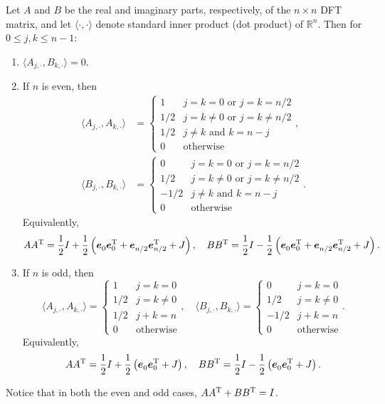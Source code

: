 \begin{lemma}
\label{lem:Inner products}
Let $A$ and $B$ be the real and imaginary parts, respectively, of the $n \times n$ DFT matrix, and let $\langle\cdot,\cdot\rangle$ denote standard inner product (dot product) of $\mathbb{R}^n$. Then for $0 \leq j,k \leq n-1$:
\begin{enumerate}[label=(\roman*)]
\item $\langle A_{j,\cdot}, B_{k,\cdot}\rangle = 0$.
\item If $n$ is even, then 
\begin{align*}
\langle A_{j,\cdot}, A_{k,\cdot}\rangle &= \begin{cases}
1 & j = k = 0 \text{ or } j = k = n/2 \\ 
1/2 & j = k \neq 0 \text{ or } j = k \neq n/2 \\ 
1/2 & j \neq k \text{ and } k = n - j \\ 
0 & \text{otherwise} \end{cases}, \\
\langle B_{j,\cdot}, B_{k,\cdot}\rangle &= \begin{cases}
0 & j = k = 0 \text{ or } j = k = n/2 \\ 
1/2 & j = k \neq 0 \text{ or } j = k \neq n/2 \\ 
-1/2 &  j \neq k \text{ and } k = n - j \\ 
0 & \text{otherwise} \end{cases}.
\end{align*}
Equivalently,
\[AA^{\mathrm{T}} = \frac{1}{2}I + \frac{1}{2}\left(\bm{e}_0^{}\bm{e}_0^{\mathrm{T}} + \bm{e}_{n/2}^{}\bm{e}_{n/2}^{\mathrm{T}} + J\right), \quad BB^{\mathrm{T}} = \frac{1}{2}I - \frac{1}{2}\left(\bm{e}_0^{}\bm{e}_0^{\mathrm{T}} + \bm{e}_{n/2}^{}\bm{e}_{n/2}^{\mathrm{T}} + J\right).\]
\item If $n$ is odd, then
\[\langle A_{j,\cdot}, A_{k,\cdot}\rangle = \begin{cases}
1 & j = k = 0 \\ 
1/2 & j = k \neq 0 \\
1/2 & j+k = n \\
0 & \text{otherwise} \end{cases}, \quad 
\langle B_{j,\cdot}, B_{k,\cdot}\rangle = \begin{cases}
0 & j = k = 0 \\ 
1/2 & j = k \neq 0 \\
-1/2 & j+k = n \\
0 & \text{otherwise} \end{cases}.\]
Equivalently,
\[AA^{\mathrm{T}} = \frac{1}{2}I + \frac{1}{2}\left(\bm{e}_0^{}\bm{e}_0^{\mathrm{T}} + J\right), \quad BB^{\mathrm{T}} = \frac{1}{2}I - \frac{1}{2}\left(\bm{e}_0^{}\bm{e}_0^{\mathrm{T}} + J\right).\]
\end{enumerate}
Notice that in both the even and odd cases, $AA^{\mathrm{T}} + BB^{\mathrm{T}} = I$.
\end{lemma}
